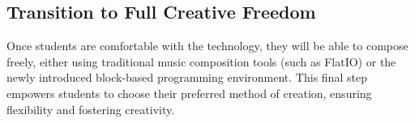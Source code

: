 \documentclass[manuscript,screen,review]{acmart}
\begin{document}
\subsection{Transition to Full Creative Freedom}
Once students are comfortable with the technology, they will be able to compose freely, either using traditional music composition tools (such as FlatIO) or the newly introduced block-based programming environment. This final step empowers students to choose their preferred method of creation, ensuring flexibility and fostering creativity.





\end{document}
